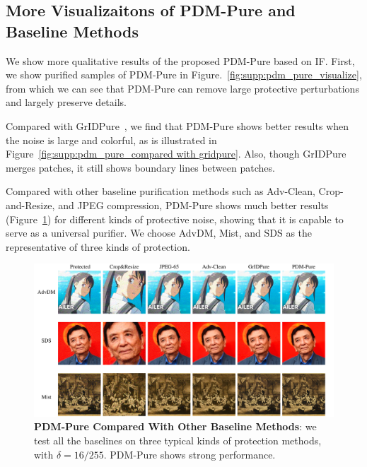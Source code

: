 \subsection{More Visualizaitons of PDM-Pure and Baseline Methods}

We show more qualitative results of the proposed PDM-Pure based on IF. First, we show purified samples of PDM-Pure in Figure.~\ref{fig:supp:pdm_pure_visualize}, from which we can see that PDM-Pure can remove large protective perturbations and largely preserve details. 

Compared with GrIDPure~\cite{zhao2023can}, we find that PDM-Pure shows better results when the noise is large and colorful, as is illustrated in Figure~\ref{fig:supp:pdm_pure_compared with gridpure}. Also, though GrIDPure merges patches, it still shows boundary lines between patches. 

Compared with other baseline purification methods such as Adv-Clean, Crop-and-Resize, and JPEG compression, PDM-Pure shows much better results (Figure~\ref{fig:supp:different_purification_methods}) for different kinds of protective noise, showing that it is capable to serve as a universal purifier. We choose AdvDM, Mist, and SDS as the representative of three kinds of protection. 

\begin{figure}
    \centering
    \includegraphics[width=.99\textwidth]{images/supp/different_purification_methods.pdf}
    \caption{
    \textbf{PDM-Pure Compared With Other Baseline Methods}: we test all the baselines on three typical kinds of protection methods, with $\delta=16/255$. PDM-Pure shows strong performance.}
    \label{fig:supp:different_purification_methods}
\end{figure}


